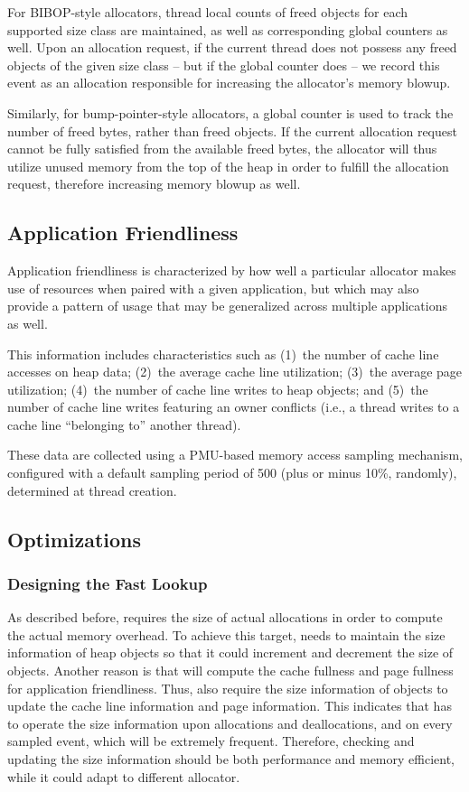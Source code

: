 For BIBOP-style allocators, thread local counts of freed objects for each supported size class are maintained, as well as corresponding global counters as well. Upon an allocation request, if the current thread does not possess any freed objects of the given size class -- but if the global counter does -- we record this event as an allocation responsible for increasing the allocator's memory blowup.

Similarly, for bump-pointer-style allocators, a global counter is used to track the number of freed bytes, rather than freed objects. If the current allocation request cannot be fully satisfied from the available freed bytes, the allocator will thus utilize unused memory from the top of the heap in order to fulfill the allocation request, therefore increasing memory blowup as well.


\subsection{Application Friendliness}
Application friendliness is characterized by how well a particular allocator makes use of resources when paired with a given application, but which may also provide a pattern of usage that may be generalized across multiple applications as well.

This information includes characteristics such as (1)~the number of cache line accesses on heap data; (2)~the average cache line utilization; (3)~the average page utilization; (4)~the number of cache line writes to heap objects; and (5)~the number of cache line writes featuring an owner conflicts (i.e., a thread writes to a cache line ``belonging to'' another thread).

These data are collected using a PMU-based memory access sampling mechanism, configured with a default sampling period of 500 (plus or minus 10\%, randomly), determined at thread creation.

\subsection{Optimizations}

\subsubsection{Designing the Fast Lookup}

\label{sec:fastlookup}

As described before, \MP{} requires the size of actual allocations in order to compute the actual memory overhead. To achieve this target, \MP{} needs to maintain the size information of heap objects so that it could increment and decrement the size of objects. Another reason is that \MP{} will compute the cache fullness and page fullness for application friendliness. Thus, \MP{} also require the size information of objects to update the cache line information and page information. This indicates that \MP{} has to operate the size information upon allocations and deallocations, and on every sampled event, which will be extremely frequent. Therefore, checking and updating the size information should be both performance and memory efficient, while it could adapt to different allocator. 

